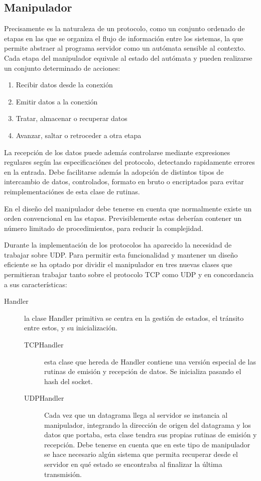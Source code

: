 \documentclass[a4paper,spanish,12pt]{book}
\begin{document}
\subsection{Manipulador}
Precisamente es la naturaleza de un protocolo, como un conjunto ordenado de etapas en las que se organiza el flujo de información entre los sistemas, la que permite abstraer al programa servidor como un autómata sensible al contexto. Cada etapa del manipulador equivale al estado del autómata y pueden realizarse un conjunto determinado de acciones:
\begin{enumerate}
	\item Recibir datos desde la conexión
	\item Emitir datos a la conexión
	\item Tratar, almacenar o recuperar datos
	\item Avanzar, saltar o retroceder a otra etapa
\end{enumerate}

La recepción de los datos puede además controlarse mediante expresiones regulares según las especificaciónes del protocolo, detectando rapidamente errores en la entrada. Debe facilitarse además la adopción de distintos tipos de intercambio de datos, controlados, formato en bruto o encriptados para evitar reimplementaciónes de esta clase de rutinas.

En el diseño del manipulador debe tenerse en cuenta que normalmente existe un orden convencional en las etapas. Previsiblemente estas deberían contener un número limitado de procedimientos, para reducir la complejidad.

Durante la implementación de los protocolos ha aparecido la necesidad de trabajar sobre UDP. Para permitir esta funcionalidad y mantener un diseño eficiente se ha optado por dividir el manipulador en tres nuevas clases que permitieran trabajar tanto sobre el protocolo TCP como UDP y en concordancia a sus características:
\begin{description}
	\item[Handler]{la clase Handler primitiva se centra en la gestión de estados, el tránsito entre estos, y su inicialización.}
	\begin{description}
		\item[TCPHandler]{esta clase que hereda de Handler contiene una versión especial de las rutinas de emisión y recepción de datos. Se inicializa pasando el hash del socket.}
		\item[UDPHandler]{Cada vez que un datagrama llega al servidor se instancia al manipulador, integrando la dirección de origen del datagrama y los datos que portaba, esta clase tendra sus propias rutinas de emisión y recepción. Debe tenerse en cuenta que en este tipo de manipulador se hace necesario algún sistema que permita recuperar desde el servidor en qué estado se encontraba al finalizar la última transmisión.}
	\end{description}
\end{description}
\end{document}
